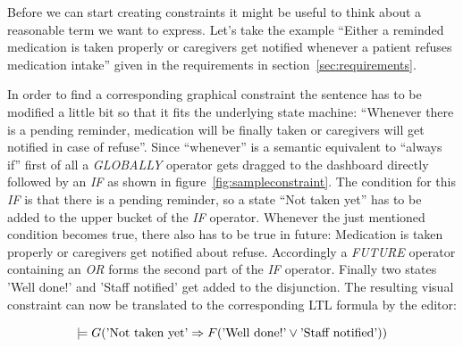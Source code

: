 \documentclass[conference]{IEEEtran}
\begin{document}
Before we can start creating constraints it might be useful to think about a reasonable term we want to express. Let's take the example ``Either a reminded medication is taken properly or caregivers get notified whenever a patient refuses medication intake'' given in the requirements in section~\ref{sec:requirements}.

In order to find a corresponding graphical constraint the sentence has to be modified a little bit so that it fits the underlying state machine: ``Whenever there is a pending reminder, medication will be finally taken or caregivers will get notified in case of refuse''.
Since ``whenever'' is a semantic equivalent to ``always if'' first of all a \emph{GLOBALLY} operator gets dragged to the dashboard directly followed by an \emph{IF} as shown in figure~\ref{fig:sampleconstraint}. The condition for this \emph{IF} is that there is a pending reminder, so a state ``Not taken yet'' has to be added to the upper bucket of the \emph{IF} operator.
Whenever the just mentioned condition becomes true, there also has to be true in future: Medication is taken properly or caregivers get notified about refuse. Accordingly a \emph{FUTURE} operator containing an \emph{OR} forms the second part of the \emph{IF} operator. Finally two states 'Well done!' and 'Staff notified' get added to the disjunction. The resulting visual constraint can now be translated to the corresponding LTL formula by the editor:

\begin{equation} \label{eq:sampleconstraint}
  \models G (\textnormal{'Not taken yet'} \Rightarrow F (\textnormal{'Well done!'} \vee \textnormal{'Staff notified'}))
\end{equation}

\end{document}
